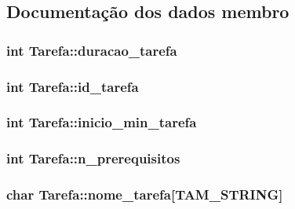 \subsection{Documentação dos dados membro}
\hypertarget{structTarefa_a7962bef326f487f4ffa7dc0f04153729}{
\subsubsection[{duracao\-\_\-tarefa}]{\setlength{\rightskip}{0pt plus 5cm}int Tarefa\-::duracao\-\_\-tarefa}}\label{structTarefa_a7962bef326f487f4ffa7dc0f04153729}
\hypertarget{structTarefa_a1509b75b75f758e2d0502df4162366f2}{
\subsubsection[{id\-\_\-tarefa}]{\setlength{\rightskip}{0pt plus 5cm}int Tarefa\-::id\-\_\-tarefa}}\label{structTarefa_a1509b75b75f758e2d0502df4162366f2}
\hypertarget{structTarefa_a7d09c30d0162c55a0aab1ad71716fae6}{
\subsubsection[{inicio\-\_\-min\-\_\-tarefa}]{\setlength{\rightskip}{0pt plus 5cm}int Tarefa\-::inicio\-\_\-min\-\_\-tarefa}}\label{structTarefa_a7d09c30d0162c55a0aab1ad71716fae6}
\hypertarget{structTarefa_a9f6369cef91f4b9d544d9e1be0bc705f}{
\subsubsection[{n\-\_\-prerequisitos}]{\setlength{\rightskip}{0pt plus 5cm}int Tarefa\-::n\-\_\-prerequisitos}}\label{structTarefa_a9f6369cef91f4b9d544d9e1be0bc705f}
\hypertarget{structTarefa_a43c0db59f4e6a3031ef2a5951ad8910f}{
\subsubsection[{nome\-\_\-tarefa}]{\setlength{\rightskip}{0pt plus 5cm}char Tarefa\-::nome\-\_\-tarefa\mbox{[}{\bf T\-A\-M\-\_\-\-S\-T\-R\-I\-N\-G}\mbox{]}}}\label{structTarefa_a43c0db59f4e6a3031ef2a5951ad8910f}

